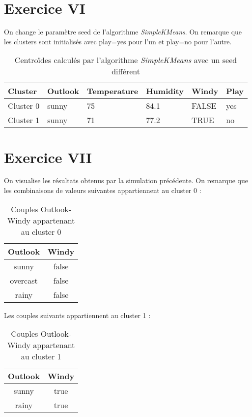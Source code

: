 \documentclass[a4paper, 11pt]{report}
\begin{document}
        \section{Exercice VI}
        On change le paramètre seed de l'algorithme \emph{SimpleKMeans}. On remarque que les clusters sont initialisés avec play=yes pour l'un et play=no pour l'autre.
        \begin{table}[h!]
        \centering
        \begin{tabular}{| l | l | l | l | l | l |}
        \hline
        Cluster & Outlook & Temperature & Humidity & Windy & Play \\
        \hline
        Cluster 0 & sunny & 75 & 84.1 & FALSE & yes \\
        \hline
        Cluster 1 & sunny & 71 & 77.2 & TRUE & no \\
        \hline

        \end{tabular}
        \caption{Centroïdes calculés par l'algorithme \emph{SimpleKMeans} avec un seed différent}
        \label{tab:exo_6}
        \end{table}
        
        \section{Exercice VII}
        On visualise les résultats obtenus par la simulation précédente. On remarque que les combinaisons de valeurs suivantes appartiennent au cluster 0 :
        \begin{table}[h!]
        \centering
        \begin{tabular}{| c | c |}
         \hline
         Outlook & Windy \\
         \hline
         sunny & false \\
         overcast & false \\
         rainy & false \\
         \hline
        
        \end{tabular}
        \caption{Couples Outlook-Windy appartenant au cluster 0}
        \label{tab:exo7_1}
        \end{table}
        
        Les couples suivants appartiennent au cluster 1 : 
        \begin{table}[h!]
        \centering
        \begin{tabular}{| c | c |}
         \hline
         Outlook & Windy \\
         \hline
         sunny & true \\
         rainy & true \\
         \hline
        
        \end{tabular}
        \caption{Couples Outlook-Windy appartenant au cluster 1}
        \label{tab:exo7_2}
        \end{table}
        
\end{document}
